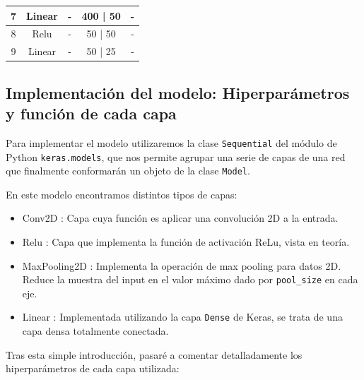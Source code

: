 \documentclass[12pt, spanish]{article}
\begin{document}
\begin{table}[H]
{\begin{tabular}{|c|c|c|c|c|}
7                       & Linear                & -                                                                                    & 400 | 50                          & -                                                                                                 \\ \hline
8                       & Relu                  & -                                                                                    & 50 | 50                           & -                                                                                                 \\ \hline
9                       & Linear                & -                                                                                    & 50 | 25                           & -                                                                                                 \\ \hline
\end{tabular}%
}
\end{table}


\subsection{Implementación del modelo: Hiperparámetros y función de cada capa}

Para implementar el modelo utilizaremos la clase \texttt{Sequential} del módulo de Python \texttt{keras.models}, que nos permite agrupar una serie de capas de una red que finalmente conformarán un objeto de la clase \texttt{Model}.

En este modelo encontramos distintos tipos de capas:

\begin{itemize}
	\item Conv2D\cite{conv2d} : Capa cuya función es aplicar una convolución 2D a la entrada.
	\item Relu\cite{relu} : Capa que implementa la función de activación ReLu, vista en teoría.
	\item MaxPooling2D\cite{maxpooling2d} : Implementa la operación de max pooling para datos 2D. Reduce la muestra del input en el valor máximo dado por \texttt{pool\_size} en cada eje.
	\item Linear : Implementada utilizando la capa \texttt{Dense}\cite{dense} de Keras, se trata de una capa densa totalmente conectada.
\end{itemize}

Tras esta simple introducción, pasaré a comentar detalladamente los hiperparámetros de cada capa utilizada:
\end{document}
